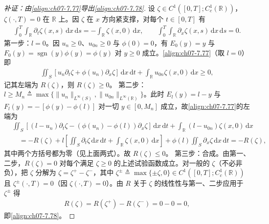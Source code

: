 ﻿\documentclass[../../main.tex]{subfiles}%
\begin{document}
\begin{proof}[补证：由\eqref{align:ch07-7.77}导出\eqref{align:ch07-7.78}]
设 $\zeta\in C^1([0,T];C^1_c(\mathbb{R}))$，$\zeta(\cdot,T)=0$ 在 $\mathbb{R}$ 上。因 $\zeta$ 在 $x$ 方向紧支撑，对每个 $t\in[0,T]$ 有
\begin{align*}
\int_0^T\int_{\mathbb{R}}\partial_t\zeta(x,s)\,\mathrm{d}x\,\mathrm{d}s=-\int_{\mathbb{R}}\zeta(x,0)\,\mathrm{d}x,\qquad
\int_0^T\int_{\mathbb{R}}\partial_x\zeta(x,s)\,\mathrm{d}x\,\mathrm{d}s=0.
\end{align*}
第一步：$l=0$。因 $u_n\geqslant0$、$u_{0n}\geqslant0$ 与 $\phi(0)=0$，有 $E_0(y)=y$ 与 $F_0(y)=\operatorname{sgn}(y)\phi(y)=\phi(y)$ 对 $y\geqslant0$ 成立。\eqref{align:ch07-7.77}（取 $l=0$）即
\begin{align*}
\iint_S[u_n\partial_t\zeta+\phi(u_n)\partial_x\zeta]\,\mathrm{d}x\,\mathrm{d}t+\int_{\mathbb{R}}u_{0n}\zeta(x,0)\,\mathrm{d}x\geqslant0,
\end{align*}
记其左端为 $R(\zeta)$，则 $R(\zeta)\geqslant0$。
第二步：$l\geqslant M_n\triangleq\max\{\|u_n\|_{L^\infty(S)},\|u_{0n}\|_{L^\infty(\mathbb{R})}\}$。此时 $E_l(y)=l-y$ 与 $F_l(y)=-\,[\phi(y)-\phi(l)]$ 对一切 $y\in[0,M_n]$ 成立，故\eqref{align:ch07-7.77}的左端为
\begin{align*}
&\iint_S[(l-u_n)\partial_t\zeta-(\phi(u_n)-\phi(l))\partial_x\zeta]\,\mathrm{d}x\,\mathrm{d}t+\int_{\mathbb{R}}(l-u_{0n})\zeta(x,0)\,\mathrm{d}x\\
&\quad=-R(\zeta)+l\left[\iint_S\partial_t\zeta\,\mathrm{d}x\,\mathrm{d}t+\int_{\mathbb{R}}\zeta(x,0)\,\mathrm{d}x\right]
+\phi(l)\iint_S\partial_x\zeta\,\mathrm{d}x\,\mathrm{d}t=-R(\zeta),
\end{align*}
其中两个方括号都为零（见上面两式）。故 $R(\zeta)\leqslant0$。
第三步：合成。由第一、二步，$R(\zeta)=0$ 对每个满足 $\zeta\geqslant0$ 的上述试验函数成立。对一般的 $\zeta$（不必非负），把 $\zeta$ 分解为 $\zeta=\zeta^+-\zeta^-$，其中 $\zeta^\pm\triangleq\max\{\pm\zeta,0\}\in C^1([0,T];C^1_c(\mathbb{R}))$ 且 $\zeta^\pm(\cdot,T)=0$（因 $\zeta(\cdot,T)=0$）。由 $R$ 关于 $\zeta$ 的线性性与第一、二步应用于 $\zeta^\pm$ 得
\begin{align*}
R(\zeta)=R(\zeta^+)-R(\zeta^-)=0-0=0,
\end{align*}
即\eqref{align:ch07-7.78}。
\end{proof}
\end{document}
